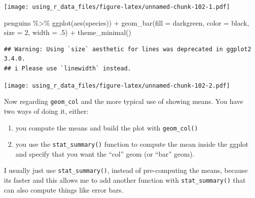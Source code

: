 \documentclass[
]{book}
\newenvironment{Shaded}{\begin{snugshade}}{\end{snugshade}}
\newcommand{\AttributeTok}[1]{\textcolor[rgb]{0.77,0.63,0.00}{#1}}
\newcommand{\DecValTok}[1]{\textcolor[rgb]{0.00,0.00,0.81}{#1}}
\newcommand{\FunctionTok}[1]{\textcolor[rgb]{0.00,0.00,0.00}{#1}}
\newcommand{\NormalTok}[1]{#1}
\newcommand{\SpecialCharTok}[1]{\textcolor[rgb]{0.00,0.00,0.00}{#1}}
\newcommand{\StringTok}[1]{\textcolor[rgb]{0.31,0.60,0.02}{#1}}
\begin{document}
\texttt{[image: using\_r\_data\_files/figure-latex/unnamed-chunk-102-1.pdf]}

\begin{Shaded}
\begin{Highlighting}[]
\NormalTok{penguins }\SpecialCharTok{\%\textgreater{}\%} 
  \FunctionTok{ggplot}\NormalTok{(}\FunctionTok{aes}\NormalTok{(species)) }\SpecialCharTok{+}
  \FunctionTok{geom\_bar}\NormalTok{(}\AttributeTok{fill =} \StringTok{\textquotesingle{}darkgreen\textquotesingle{}}\NormalTok{, }\AttributeTok{color =} \StringTok{\textquotesingle{}black\textquotesingle{}}\NormalTok{, }\AttributeTok{size =} \DecValTok{2}\NormalTok{, }\AttributeTok{width =}\NormalTok{ .}\DecValTok{5}\NormalTok{) }\SpecialCharTok{+}
  \FunctionTok{theme\_minimal}\NormalTok{()}
\end{Highlighting}
\end{Shaded}

\begin{verbatim}
## Warning: Using `size` aesthetic for lines was deprecated in ggplot2 3.4.0.
## i Please use `linewidth` instead.
\end{verbatim}

\texttt{[image: using\_r\_data\_files/figure-latex/unnamed-chunk-102-2.pdf]}

Now regarding \texttt{geom\_col} and the more typical use of showing means.
You have two ways of doing it, either:

\begin{enumerate}
\def\labelenumi{\arabic{enumi}.}
\item
  you compute the means and build the plot with \texttt{geom\_col()}
\item
  you use the \texttt{stat\_summary()} function to compute the mean inside the ggplot and specify that you want the ``col'' geom (or ``bar'' geom).
\end{enumerate}

I usually just use \texttt{stat\_summary()}, instead of pre-computing the means, because its faster and this allows me to add another function with \texttt{stat\_summary()} that can also compute things like error bars.
\end{document}
